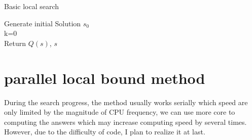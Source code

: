 \documentclass[10pt, Oct]{IEEEtran}
\begin{document}
\begin{algorithm}
	\caption{Basic local search}
	\label{alg:3}
	Generate initial Solution $s_0$\\
	k=0\\
	Return $Q(s)$, $s$
\end{algorithm}


\section{parallel local bound method}
During the search progress, the method usually works serially which speed are only limited by the magnitude of CPU frequency, we can use more core to computing the answers which may increase computing speed by several times. However, due to the difficulty of code, I plan to realize it at last.


\end{document}
